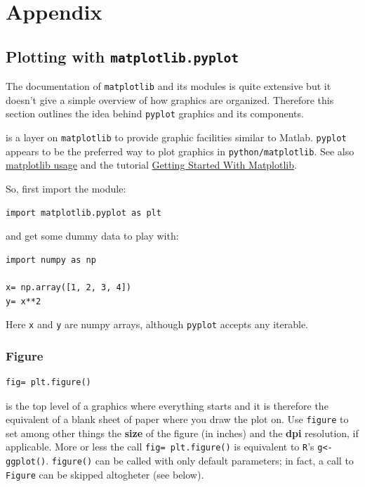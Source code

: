 \section{Appendix}

\subsection{Plotting with \texttt{matplotlib.pyplot}}

The documentation of \texttt{matplotlib} and its modules is quite extensive
but it doesn't give a simple overview of how graphics are organized. Therefore this
section outlines the idea behind \texttt{pyplot} graphics and its components. 

 is a layer on \texttt{matplotlib} to provide graphic facilities
similar to Matlab. \texttt{pyplot} appears to be the preferred way to plot
graphics in \texttt{python/matplotlib}. See also \href{http://matplotlib.org/faq/usage_faq.html}{matplotlib usage} and 
the tutorial \href{https://github.com/ericliang/matplotlib/blob/master/trunk/scipy06/oo_resources/leftwich_tut.txt}
{Getting Started With Matplotlib}.

So, first import the  module:

\begin{verbatim}
import matplotlib.pyplot as plt
\end{verbatim}

and get some dummy data to play with:

\begin{verbatim}
import numpy as np

x= np.array([1, 2, 3, 4])
y= x**2
\end{verbatim}

Here \texttt{x} and \texttt{y} are numpy arrays, although \texttt{pyplot} accepts
any iterable.

\subsubsection{Figure}
\begin{verbatim}
fig= plt.figure()
\end{verbatim}

 is the top level of a graphics where everything starts
and it is therefore the equivalent of a blank sheet of paper where you draw the plot on. Use \texttt{figure}
to set among other things the \textbf{size} of the figure (in inches) and the \textbf{dpi} resolution,
if applicable. More or less the call \texttt{fig= plt.figure()} is equivalent to
\texttt{R}'s \texttt{g<- ggplot()}. \texttt{figure()} can be called with only default parameters;
in fact, a call to \texttt{Figure} can be skipped altogheter (see below). 

